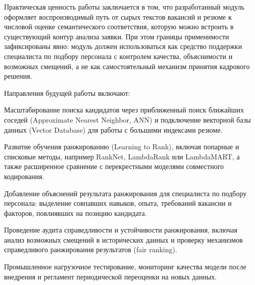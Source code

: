 Практическая ценность работы заключается в том, что разработанный модуль оформляет воспроизводимый путь от сырых текстов вакансий и резюме к числовой оценке семантического соответствия, которую можно встроить в существующий контур анализа заявки. При этом границы применимости зафиксированы явно: модуль должен использоваться как средство поддержки специалиста по подбору персонала с контролем качества, объяснимости и возможных смещений, а не как самостоятельный механизм принятия кадрового решения.\par
Направления будущей работы включают:\par
\begin{compactenum}
  \item Масштабирование поиска кандидатов через приближенный поиск ближайших соседей (Approximate Nearest Neighbor, ANN) и подключение векторной базы данных (Vector Database) для работы с большими индексами резюме.
  \item Развитие обучения ранжированию (Learning to Rank), включая попарные и списковые методы, например RankNet, LambdaRank или LambdaMART, а также расширенное сравнение с перекрестными моделями совместного кодирования.
  \item Добавление объяснений результата ранжирования для специалиста по подбору персонала: выделение совпавших навыков, опыта, требований вакансии и факторов, повлиявших на позицию кандидата.
  \item Проведение аудита справедливости и устойчивости ранжирования, включая анализ возможных смещений в исторических данных и проверку механизмов справедливого ранжирования результатов (fair ranking).
  \item Промышленное нагрузочное тестирование, мониторинг качества модели после внедрения и регламент периодической переоценки на новых данных.
\end{compactenum}
